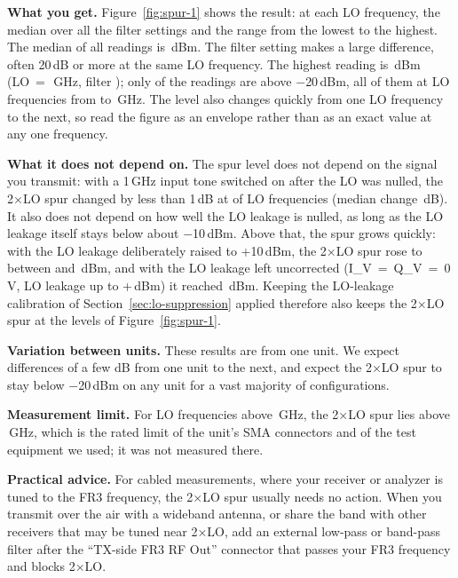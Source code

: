\textbf{What you get.} Figure~\ref{fig:spur-1} shows the result: at each LO frequency, the median over all the filter settings and the range from the lowest to the highest. The median of all \twoLoReadCount{} readings is \twoLoMedian\,dBm. The filter setting makes a large difference, often 20\,dB or more at the same LO frequency. The highest reading is \twoLoMax\,dBm (LO~=~\twoLoMaxLo\,GHz, filter \twoLoMaxFilter); only \twoLoAboveTwenty{} of the \twoLoReadCount{} readings are above $-$20\,dBm, all of them at LO frequencies from \twoLoAboveLoMin{} to \twoLoAboveLoMax\,GHz. The level also changes quickly from one LO frequency to the next, so read the figure as an envelope rather than as an exact value at any one frequency.

\textbf{What it does not depend on.} The spur level does not depend on the signal you transmit: with a 1\,GHz
input tone switched on after the LO was nulled, the 2×LO spur changed by less than 1\,dB at \spurToneWithinOne{}
of \spurToneCount{} LO frequencies (median change \spurToneMedianDiff\,dB). It also does not depend on how well the
LO leakage is nulled, as long as the LO leakage itself stays below about $-$10\,dBm. Above that, the spur grows
quickly: with the LO leakage deliberately raised to +10\,dBm, the 2×LO spur rose to between \spurAmpLow{} and
\spurAmpHigh\,dBm, and with the LO leakage left uncorrected (I\_V~=~Q\_V~=~0\,V, LO leakage up to
+\spurZeroBiasLoMax\,dBm) it reached \spurZeroBiasWorst\,dBm. Keeping the LO-leakage calibration of
Section~\ref{sec:lo-suppression} applied therefore also keeps the 2×LO spur at the levels of
Figure~\ref{fig:spur-1}.

\textbf{Variation between units.} These results are from one unit. We expect differences of a few dB from one unit to the next, and expect the 2×LO spur to stay below $-$20\,dBm on any unit for a vast majority of configurations.

\textbf{Measurement limit.} For LO frequencies above \spurLoLimit\,GHz, the 2×LO spur lies above
\spurTwoLoLimit\,GHz, which is the rated limit of the unit's SMA connectors and of the test equipment we used; it
was not measured there.

\textbf{Practical advice.} For cabled measurements, where your receiver or analyzer is tuned to the FR3 frequency,
the 2×LO spur usually needs no action. When you transmit over the air with a wideband antenna, or share the band
with other receivers that may be tuned near 2×LO, add an external low-pass or band-pass filter after the
``TX-side FR3 RF Out'' connector that passes your FR3 frequency and blocks 2×LO.

